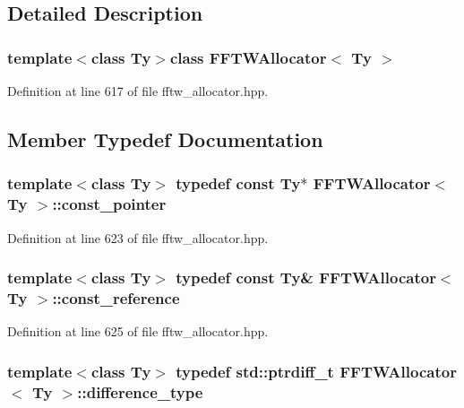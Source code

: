 \subsection{Detailed Description}
\subsubsection*{template$<$class Ty$>$class F\-F\-T\-W\-Allocator$<$ Ty $>$}



Definition at line 617 of file fftw\-\_\-allocator.\-hpp.



\subsection{Member Typedef Documentation}
\hypertarget{class_f_f_t_w_allocator_a71836314e7780aa80122a04ba06a2e82}{
\subsubsection[{const\-\_\-pointer}]{\setlength{\rightskip}{0pt plus 5cm}template$<$class Ty$>$ typedef const Ty$\ast$ {\bf F\-F\-T\-W\-Allocator}$<$ Ty $>$\-::{\bf const\-\_\-pointer}}}\label{class_f_f_t_w_allocator_a71836314e7780aa80122a04ba06a2e82}


Definition at line 623 of file fftw\-\_\-allocator.\-hpp.

\hypertarget{class_f_f_t_w_allocator_ad6bfad7e0412d7f234b573e6cc5cf4ce}{
\subsubsection[{const\-\_\-reference}]{\setlength{\rightskip}{0pt plus 5cm}template$<$class Ty$>$ typedef const Ty\& {\bf F\-F\-T\-W\-Allocator}$<$ Ty $>$\-::{\bf const\-\_\-reference}}}\label{class_f_f_t_w_allocator_ad6bfad7e0412d7f234b573e6cc5cf4ce}


Definition at line 625 of file fftw\-\_\-allocator.\-hpp.

\hypertarget{class_f_f_t_w_allocator_a34bdb68f487106d45488ea733006cb58}{
\subsubsection[{difference\-\_\-type}]{\setlength{\rightskip}{0pt plus 5cm}template$<$class Ty$>$ typedef std\-::ptrdiff\-\_\-t {\bf F\-F\-T\-W\-Allocator}$<$ Ty $>$\-::{\bf difference\-\_\-type}}}\label{class_f_f_t_w_allocator_a34bdb68f487106d45488ea733006cb58}



